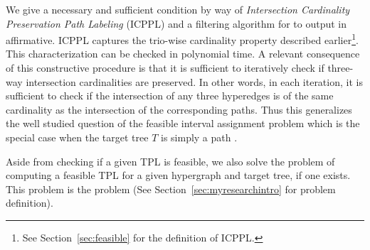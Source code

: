 We give a necessary and sufficient condition by way of {\em
  Intersection Cardinality Preservation Path Labeling} (ICPPL) and a
filtering algorithm for {\FTPL} to output in affirmative. ICPPL
captures the trio-wise cardinality property described
earlier\footnote{See Section~\ref{sec:feasible} for the definition of
  ICPPL.}. This characterization can be checked in polynomial time.  A
relevant consequence of this constructive procedure is that it is
sufficient to iteratively check if three-way intersection
cardinalities are preserved.  In other words, in each iteration, it is
sufficient to check if the intersection of any three hyperedges is of
the same cardinality as the intersection of the corresponding paths.
Thus this generalizes the well studied question of the feasible
interval assignment problem which is the special case when the target
tree $T$ is simply a path \cite{wlh02,nsnrs09}.

Aside from checking if a given TPL is feasible, we also solve the
problem of computing a feasible TPL for a given hypergraph and target
tree, if one exists. This problem is the {\CFTPL} problem (See
Section~\ref{sec:myresearchintro} for problem definition). %



